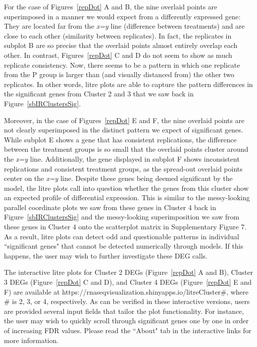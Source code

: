 \documentclass{bioinfo}
\begin{document}
For the case of Figures~\ref{repDot} A and B, the nine overlaid points are superimposed in a manner we would expect from a differently expressed gene: They are located far from the \textit{x=y} line (difference between treatments) and are close to each other (similarity between replicates). In fact, the replicates in subplot B are so precise that the overlaid points almost entirely overlap each other. In contrast, Figures~\ref{repDot} C and D do not seem to show as much replicate consistency. Now, there seems to be a pattern in which one replicate from the P group is larger than (and visually distanced from) the other two replicates. In other words, litre plots are able to capture the pattern differences in the significant genes from Cluster 2 and 3 that we saw back in Figure~\ref{sbIRClustersSig}.

Moreover, in the case of Figures~\ref{repDot} E and F, the nine overlaid points are not clearly superimposed in the distinct pattern we expect of significant genes. While subplot E shows a gene that has consistent replications, the difference between the treatment groups is so small that the overlaid points cluster around the \textit{x=y} line. Additionally, the gene displayed in subplot F shows inconsistent replications and consistent treatment groups, as the spread-out overlaid points center on the \textit{x=y} line. Despite these genes being deemed significant by the model, the litre plots call into question whether the genes from this cluster show an expected profile of differential expression. This is similar to the messy-looking parallel coordinate plots we saw from these genes in Cluster 4 back in Figure~\ref{sbIRClustersSig} and the messy-looking superimposition we saw from these genes in Cluster 4 onto the scatterplot matrix in Supplementary Figure 7. As a result, litre plots can detect odd and questionable patterns in individual ``significant genes" that cannot be detected numerically through models. If this happens, the user may wish to further investigate these DEG calls.

The interactive litre plots for Cluster 2 DEGs (Figure~\ref{repDot} A and B), Cluster 3 DEGs (Figure~\ref{repDot} C and D), and Cluster 4 DEGs (Figure~\ref{repDot} E and F) are available at https://rnaseqvisualization.shinyapps.io/litreCluster\#, where \# is 2, 3, or 4, respectively. As can be verified in these interactive versions, users are provided several input fields that tailor the plot functionality. For instance, the user may wish to quickly scroll through significant genes one by one in order of increasing FDR values. Please read the ``About" tab in the interactive links for more information.
\end{document}
